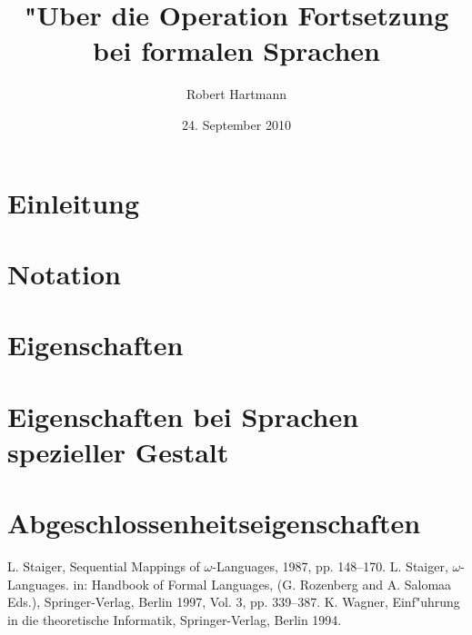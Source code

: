\documentclass[12pt]{scrreprt}
\author{Robert Hartmann}
\title{"Uber die Operation Fortsetzung bei formalen Sprachen}
\date{24. September 2010}
\theoremstyle{remark}
\begin{document}

%

\pagestyle{plain}
\tableofcontents[hideallsubsections]

\onehalfspacing

\chapter{Einleitung}


\chapter{Notation}


\chapter{Eigenschaften}


\chapter{Eigenschaften bei Sprachen spezieller Gestalt}


\chapter{Abgeschlossenheitseigenschaften}


\begin{thebibliography}{9}
L. Staiger, Sequential Mappings of $\omega$-Languages, 1987, pp. 148--170.
L. Staiger, $\omega$-Languages. in: Handbook of Formal Languages, (G. Rozenberg and A. Salomaa Eds.), Springer-Verlag, Berlin 1997, Vol. 3, pp. 339--387.
K. Wagner, Einf"uhrung in die theoretische Informatik, Springer-Verlag, Berlin 1994.

\end{thebibliography}



\end{document}
